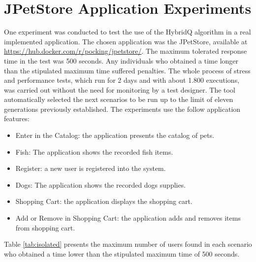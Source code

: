 
\section{JPetStore Application Experiments}

One experiment was conducted to test the use of the HybridQ algorithm in a real implemented application. The chosen application was the JPetStore, available at \url{https://hub.docker.com/r/pocking/jpetstore/}. The maximum tolerated response time in the test was 500 seconds.  Any  individuals who obtained a time longer than the stipulated maximum time suffered penalties.  The whole process of stress and performance tests, which run for 2 days and  with about 1.800 executions, was carried out without the need for monitoring by a test designer. The tool automatically selected the next scenarios to be run up to the limit of eleven generations previously established. The experiments use the follow application features:


\begin{itemize}
\item Enter in the Catalog: the application presents the catalog of pets.
\item Fish: The application shows the recorded fish items.
\item Register:  a new user is registered into the system.
\item Dogs: The application shows the recorded dogs supplies.
\item Shopping Cart: the application displays the shopping cart.
\item Add or Remove in Shopping Cart: the application adds and removes items from shopping cart.
\end{itemize}

Table \ref{tab:isolated} presents the maximum number of users found in each scenario who obtained a time lower than the stipulated maximum time of 500 seconds.


